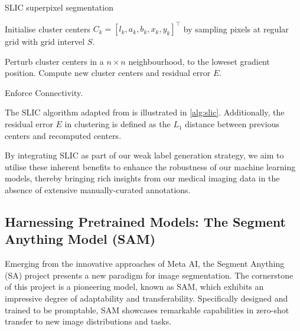 \begin{algorithm}[ht]
\caption{SLIC superpixel segmentation}\label{alg:slic}
\begin{algorithmic}[1]
\item Initialise cluster centers \(C_{k} = \left[l_{k}, a_{k}, b_{k}, x_{k}, y_{k}\right]^{\top}\) by sampling pixels at regular grid with grid intervel \(S\).
\item Perturb cluster centers in a \(n \times n\) neighbourhood, to the loweset gradient position.
    \EndFor
    \State Compute new cluster centers and residual error \(E\).
\EndWhile
\item Enforce Connectivity.
\end{algorithmic}
\end{algorithm}

The SLIC algorithm adapted from \cite{achanta2010slic} is illustrated in \autoref{alg:slic}. Additionally, the residual error \(E\) in clustering is defined as the \(L_{1}\) distance between previous centers and recomputed centers.

By integrating SLIC as part of our weak label generation strategy, we aim to utilise these inherent benefits to enhance the robustness of our machine learning models, thereby bringing rich insights from our medical imaging data in the absence of extensive manually-curated annotations.

\subsection{Harnessing Pretrained Models: The Segment Anything Model (SAM)}
Emerging from the innovative approaches of Meta AI, the Segment Anything (SA) project presents a new paradigm for image segmentation. The cornerstone of this project is a pioneering model, known as SAM, which exhibits an impressive degree of adaptability and transferability. Specifically designed and trained to be promptable, SAM showcases remarkable capabilities in zero-shot transfer to new image distributions and tasks.

